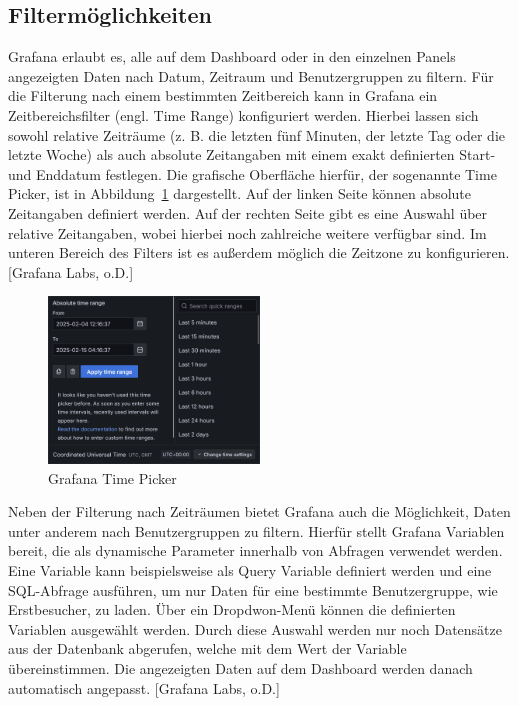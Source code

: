 \subsection{Filtermöglichkeiten}
Grafana erlaubt es, alle auf dem Dashboard oder in den einzelnen Panels angezeigten Daten nach Datum, Zeitraum und Benutzergruppen zu filtern. Für die Filterung nach einem bestimmten Zeitbereich kann in Grafana ein Zeitbereichsfilter (engl. Time Range) konfiguriert werden. Hierbei lassen sich sowohl relative Zeiträume (z. B. die letzten fünf Minuten, der letzte Tag oder die letzte Woche) als auch absolute Zeitangaben mit einem exakt definierten Start- und Enddatum festlegen. Die grafische Oberfläche hierfür, der sogenannte Time Picker, ist in Abbildung~\ref{fig:timerange} dargestellt. Auf der linken Seite können absolute Zeitangaben definiert werden. Auf der rechten Seite gibt es eine Auswahl über relative Zeitangaben, wobei hierbei noch zahlreiche weitere verfügbar sind. Im unteren Bereich des Filters ist es außerdem möglich die Zeitzone zu konfigurieren. [Grafana Labs, o.D.]

\begin{figure}[h!]
    \centering
    \includegraphics[width=0.5\textwidth]{images/timerange.png}
    \caption{Grafana Time Picker}%
    \label{fig:timerange}%
\end{figure}

Neben der Filterung nach Zeiträumen bietet Grafana auch die Möglichkeit, Daten unter anderem nach Benutzergruppen zu filtern. Hierfür stellt Grafana Variablen bereit, die als dynamische Parameter innerhalb von Abfragen verwendet werden. Eine Variable kann beispielsweise als Query Variable definiert werden und eine SQL-Abfrage ausführen, um nur Daten für eine bestimmte Benutzergruppe, wie Erstbesucher, zu laden. Über ein Dropdwon-Menü können die definierten Variablen ausgewählt werden. Durch diese Auswahl werden nur noch Datensätze aus der Datenbank abgerufen, welche mit dem Wert der Variable übereinstimmen. Die angezeigten Daten auf dem Dashboard werden danach automatisch angepasst. [Grafana Labs, o.D.]

